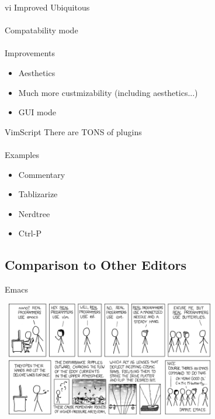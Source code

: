 \documentclass{beamer}
\begin{document}
            \begin{frame}{vi Improved}
                Ubiquitous \\~\\
                Compatability mode \\~\\
                Improvements
                \begin{itemize}
                    \item Aesthetics
                    \item Much more custmizability (including aesthetics...)
                    \item GUI mode
                \end{itemize}
            \end{frame}

            \begin{frame}{VimScript}
                There are TONS of plugins \\~\\
                Examples
                \begin{itemize}
                    \item Commentary
                    \item Tablizarize
                    \item Nerdtree
                    \item Ctrl-P
                \end{itemize}
            \end{frame}

        \subsection{Comparison to Other Editors}

            \begin{frame}{Emacs}
                \begin{center}
                \includegraphics[width = 9.5cm, height = 5cm]{real_programmers.png}
                \end{center}
            \end{frame}
\end{document}
